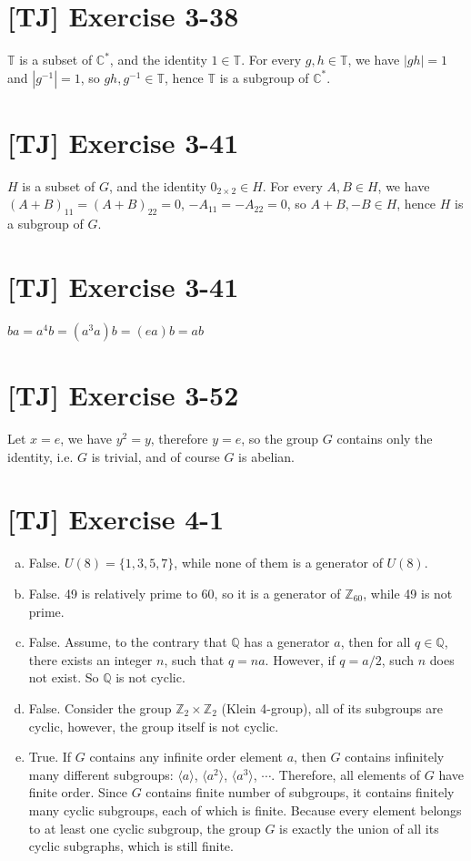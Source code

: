 \documentclass[a4paper,11pt,twocolumn]{article}
\begin{document}
  \section{[TJ] Exercise 3-38}
  $\mathbb{T}$ is a subset of $\mathbb{C}^*$, and the identity $1 \in \mathbb{T}$. For every $g, h \in \mathbb{T}$, we have $|gh| = 1$ and $|g^{-1}| = 1$, so $gh, g^{-1} \in \mathbb{T}$, hence $\mathbb{T}$ is a subgroup of $\mathbb{C}^*$.

  \section{[TJ] Exercise 3-41}
  $H$ is a subset of $G$, and the identity $0_{2 \times 2} \in H$. For every $A, B \in H$, we have $(A+B)_{11} = (A+B)_{22} = 0$, $-A_{11} = -A_{22} = 0$, so $A+B, -B \in H$, hence $H$ is a subgroup of $G$.

  \section{[TJ] Exercise 3-41}
  $ba = a^4b = (a^3a)b = (ea)b = ab$

  \section{[TJ] Exercise 3-52}
  Let $x = e$, we have $y^2 = y$, therefore $y = e$, so the group $G$ contains only the identity, i.e. $G$ is trivial, and of course $G$ is abelian.

  \section{[TJ] Exercise 4-1}
  \begin{enumerate}[(a)]
    \item False. $U(8) = \{1, 3, 5, 7\}$, while none of them is a generator of $U(8)$.
    \item False. 49 is relatively prime to 60, so it is a generator of $\mathbb{Z}_{60}$, while 49 is not prime.
    \item False. Assume, to the contrary that $\mathbb{Q}$ has a generator $a$, then for all $q \in \mathbb{Q}$, there exists an integer $n$, such that $q = na$. However, if $q = a / 2$, such $n$ does not exist. So $\mathbb{Q}$ is not cyclic.
    \item False. Consider the group $\mathbb{Z}_2 \times \mathbb{Z}_2$ (Klein 4-group), all of its subgroups are cyclic, however, the group itself is not cyclic.
    \item True. If $G$ contains any infinite order element $a$, then $G$ contains infinitely many different subgroups: $\langle a \rangle$, $\langle a^2 \rangle$, $\langle a^3 \rangle$, $\cdots$. Therefore, all elements of $G$ have finite order. Since $G$ contains finite number of subgroups, it contains finitely many cyclic subgroups, each of which is finite. Because every element belongs to at least one cyclic subgroup, the group $G$ is exactly the union of all its cyclic subgraphs, which is still finite.
  \end{enumerate}
\end{document}
